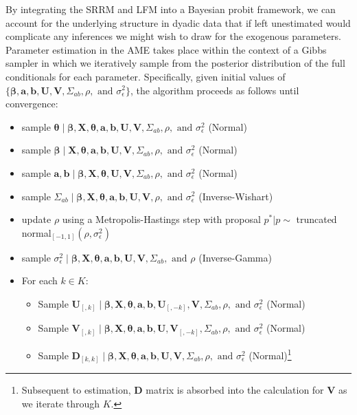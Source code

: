 By integrating the SRRM and LFM into a Bayesian probit framework, we can account for the underlying structure in dyadic data that if left unestimated would complicate any inferences we might wish to draw for the exogenous parameters. Parameter estimation in the AME takes place within the context of a Gibbs sampler in which we iteratively sample from the posterior distribution of the full conditionals for each parameter. Specifically, given initial values of $\{\bm\beta, \mathbf{a}, \mathbf{b}, \mathbf{U}, \mathbf{V}, \Sigma_{ab}, \rho, \text{ and } \sigma_{\epsilon}^{2}\}$, the algorithm proceeds as follows until convergence:

 \begin{itemize}
 	\item sample $\bm\theta \; | \;  \bm\beta, \mathbf{X}, \bm\theta, \mathbf{a}, \mathbf{b}, \mathbf{U}, \mathbf{V}, \Sigma_{ab}, \rho, \text{ and } \sigma_{\epsilon}^{2}$ (Normal)
 	\item sample $\bm\beta \; | \;  \mathbf{X}, \bm\theta, \mathbf{a}, \mathbf{b}, \mathbf{U}, \mathbf{V}, \Sigma_{ab}, \rho, \text{ and } \sigma_{\epsilon}^{2}$ (Normal)
 	\item sample $\mathbf{a}, \mathbf{b} \; | \; \bm\beta, \mathbf{X}, \bm\theta, \mathbf{U}, \mathbf{V}, \Sigma_{ab}, \rho, \text{ and } \sigma_{\epsilon}^{2}$ (Normal)
	\item sample $\Sigma_{ab} \; | \; \bm\beta, \mathbf{X}, \bm\theta, \mathbf{a}, \mathbf{b}, \mathbf{U}, \mathbf{V}, \rho, \text{ and } \sigma_{\epsilon}^{2}$ (Inverse-Wishart)
 	\item update $\rho$ using a Metropolis-Hastings step with proposal $p^{*} | p  \sim$ truncated normal$_{[-1,1]}(\rho, \sigma_{\epsilon}^{2})$
 	\item sample $\sigma_{\epsilon}^{2} \; | \; \bm\beta, \mathbf{X}, \bm\theta, \mathbf{a}, \mathbf{b}, \mathbf{U}, \mathbf{V}, \Sigma_{ab}, \text{ and } \rho$ (Inverse-Gamma)
 	\item For each $k \in K$:
 	\begin{itemize}
 		\item Sample $\mathbf{U}_{[,k]} \; | \; \bm\beta, \mathbf{X}, \bm\theta, \mathbf{a}, \mathbf{b}, \mathbf{U}_{[,-k]}, \mathbf{V}, \Sigma_{ab}, \rho, \text{ and } \sigma_{\epsilon}^{2}$ (Normal)
 		\item Sample $\mathbf{V}_{[,k]} \; | \; \bm\beta, \mathbf{X}, \bm\theta, \mathbf{a}, \mathbf{b}, \mathbf{U}, \mathbf{V}_{[,-k]}, \Sigma_{ab}, \rho, \text{ and } \sigma_{\epsilon}^{2}$ (Normal)
 		\item Sample $\mathbf{D}_{[k,k]}  \; | \; \bm\beta, \mathbf{X}, \bm\theta,\mathbf{a}, \mathbf{b}, \mathbf{U}, \mathbf{V}, \Sigma_{ab}, \rho, \text{ and } \sigma_{\epsilon}^{2}$ (Normal)\footnote{Subsequent to estimation, $\mathbf{D}$ matrix is absorbed into the calculation for $\mathbf{V}$ as we iterate through $K$. }
 	\end{itemize}
 \end{itemize}

